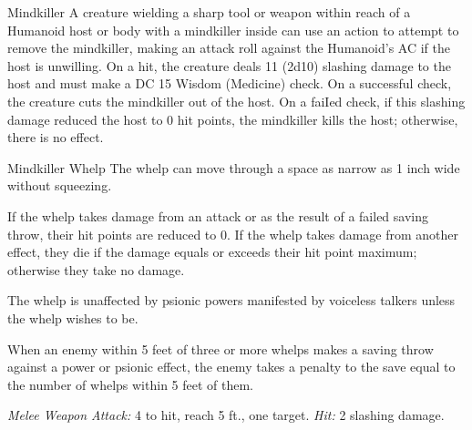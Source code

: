\documentclass[10pt,a4paper,twoside,bg=print,twocolumn,openany,nodeprecatedcode]{dndbook}
\begin{document}
\begin{DndMonster}[float=t]{Mindkiller}
A creature wielding a sharp tool or weapon within reach of a Humanoid host or body with a mindkiller inside can use an action to attempt to remove the mindkiller, making an attack roll against the Humanoid's AC if the host is unwilling. On a hit, the creature deals 11 (2d10) slashing damage to the host and must make a DC 15 Wisdom (Medicine) check. On a successful check, the creature cuts the mindkiller out of the host. On a faiIed check, if this slashing damage reduced the host to 0 hit points, the mindkiller kills the host; otherwise, there is no effect.

\end{DndMonster}



\begin{DndMonster}[float=t]{Mindkiller Whelp}
\DndMonsterBasics[
armor-class = {12},
hit-points = {\DndDice{9}},
speed = {10 ft., fly 30 ft.}
]
\DndMonsterAbilityScores[
 str = 10,
 dex = 14,
 con = 11,
 int = 14,
 wis = 12,
 cha = 12
]
\DndMonsterDetails[
senses = {darkvision 120 ft., passive perception 11},
languages = {Deep Speech, Undercommon, telepathy 120 ft.},
challenge = 2,
]
The whelp can move through a space as narrow as 1 inch wide without squeezing.

If the whelp takes damage from an attack or as the result of a failed saving throw, their hit points are reduced to 0. If the whelp takes damage from another effect, they die if the damage equals or exceeds their hit point maximum; otherwise they take no damage.

The whelp is unaffected by psionic powers manifested by voiceless talkers unless the whelp wishes to be.

When an enemy within 5 feet of three or more whelps makes a saving throw against a power or psionic effect, the enemy takes a penalty to the save equal to the number of whelps within 5 feet of them.

\textsl{Melee Weapon Attack:} 4 to hit, reach 5 ft., one target. \textsl{Hit:} 2 slashing damage.

\end{DndMonster}
\end{document}
